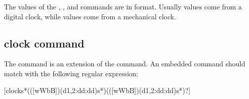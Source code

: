 \documentclass[letterpaper,10pt,english]{sphinxmanual}
\begin{document}
\sphinxAtStartPar
The values of the , ,  and  commands are in  format.
Usually  values come from a digital clock, while  values come from
a mechanical clock.

\sphinxAtStartPar
{}

\begin{sphinxVerbatim}[commandchars=\\\{\}]
  \PYG{p}{[} \PYG{p}{]}
\end{sphinxVerbatim}


\subsection{clock command}
\label{\detokenize{commands:clock-command}}
\sphinxAtStartPar
The  command is an extension of the  command.
An embedded  command should match with the following regular expression:

\begin{sphinxVerbatim}[commandchars=\\\{\}]
\PYGZbs{}[\PYGZpc{}clock\PYGZbs{}s*(([wWbB])(\PYGZbs{}d\PYGZob{}1,2\PYGZcb{}:\PYGZbs{}d\PYGZbs{}d:\PYGZbs{}d\PYGZbs{}d)\PYGZbs{}s*)(([wWbB])(\PYGZbs{}d\PYGZob{}1,2\PYGZcb{}:\PYGZbs{}d\PYGZbs{}d:\PYGZbs{}d\PYGZbs{}d)\PYGZbs{}s*)?\PYGZbs{}]
\end{sphinxVerbatim}

\sphinxAtStartPar
{}

\begin{sphinxVerbatim}[commandchars=\\\{\}]
  \PYG{p}{[}  \PYG{p}{]}

 \PYG{p}{[} \PYG{p}{]}    
\PYG{p}{[} \PYG{p}{]}   
\end{sphinxVerbatim}
\end{document}
